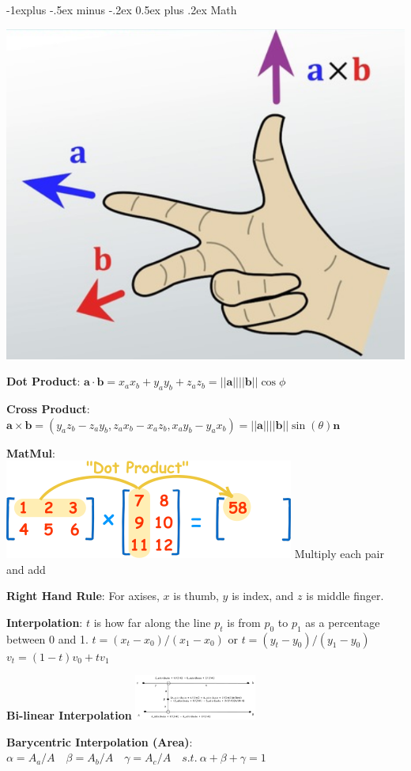 \documentclass[letterpaper, 8pt]{extarticle}
\makeatletter
\renewcommand{\section}{\@startsection{section}{1}{0mm}%
                                {-1explus -.5ex minus -.2ex}%
                                {0.5ex plus .2ex}%
                                {\normalfont\normalsize\bfseries}}
\makeatother
\begin{document}
\begin{multicols*}{4}

\section{Math}

\includegraphics[width=.3\linewidth]{right-hand-rule.png}

\textbf{Dot Product}:
\(
\mathbf{a} \cdot \mathbf{b}
= x_a x_b + y_a y_b + z_a z_b
= ||\mathbf{a}|| ||\mathbf{b}|| \cos \phi
\)

\textbf{Cross Product}:
\(
\mathbf{a} \times \mathbf{b}
= (y_a z_b - z_a y_b, z_a x_b - x_a z_b, x_a y_b - y_a x_b)
= ||\mathbf{a}|| ||\mathbf{b}|| \sin(\theta) \mathbf{n}
\)

\textbf{MatMul}:\\
\includegraphics[width=0.75\linewidth]{matrix-multiply-a.png}
Multiply each pair and add

\textbf{Right Hand Rule}:
For axises, $x$ is thumb, $y$ is index, and $z$ is middle finger.

\textbf{Interpolation}:
\(t\) is how far along the line \(p_t\) is from \(p_0\) to \(p_1\) as a percentage between 0 and 1.
\(
t = (x_t - x_0) / (x_1 - x_0)
\text{ or }
t = (y_t - y_0) / (y_1 - y_0)
\)
\(
v_t = (1-t) v_0 + t v_1
\)

\textbf{Bi-linear Interpolation}
\includegraphics[width=4cm]{bilinear-interpolation.png}

\textbf{Barycentric Interpolation (Area)}:
\(
\alpha = A_a / A \quad
\beta = A_b / A \quad
\gamma = A_c / A \quad
s.t.\ \alpha + \beta + \gamma = 1
\)


\end{multicols*}
\end{document}
